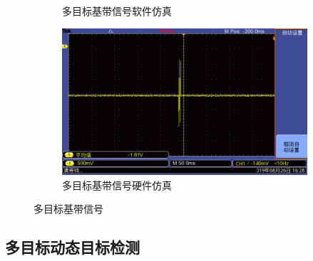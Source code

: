 \documentclass{article}
\newcounter{sub}
\begin{document}
\begin{figure}[H]
\begin{subfigure}[H]{.45\linewidth}
		\caption{多目标基带信号软件仿真}
		\label{fig:多目标基带信号软件仿真}
	\end{subfigure}
	\quad
	\begin{subfigure}[H]{.45\linewidth}
		\centering
		\includegraphics[width=\linewidth]{two-baseband-hardware.png}
		\caption{多目标基带信号硬件仿真}
		\label{fig:多目标基带信号硬件仿真}
	\end{subfigure}
	\caption{多目标基带信号}
	\label{fig:多目标基带信号}
\end{figure}

\subsection{多目标动态目标检测}%
\label{sub:多目标动态目标检测}
\end{document}
